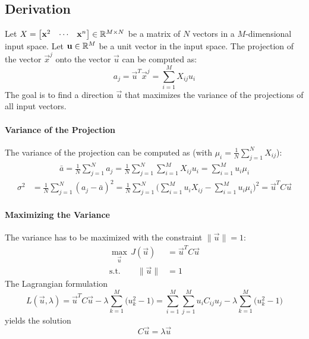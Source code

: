 		\subsection{Derivation}
			Let \( X = \begin{bmatrix} \boldsymbol{\mathrm{x}}^2 & \cdots & \boldsymbol{\mathrm{x}}^n \end{bmatrix} \in \mathbb{R}^{M \times N} \) be a matrix of \(N\) vectors in a \(M\)-dimensional input space. Let \( \boldsymbol{\mathrm{u}} \in \mathbb{R}^M \) be a unit vector in the input space. The projection of the vector \( \vec{x}^j \) onto the vector \(\vec{u}\) can be computed as:
			\begin{equation}
				a_j = \vec{u}^T \vec{x}^j = \sum_{i = 1}^{M} X_{ij} u_i
			\end{equation}
			The goal is to find a direction \(\vec{u}\) that maximizes the variance of the projections of all input vectors.

			\paragraph{Variance of the Projection} %
				The variance of the projection can be computed as (with \( \mu_i = \frac{1}{N} \sum_{j = 1}^{N} X_{ij} \)):
				\begin{align}
					\bar{a} = \frac{1}{N} \sum_{j = 1}^{N} a_j = \frac{1}{N} \sum_{j = 1}^{N} \sum_{i = 1}^{M} X_{ij} u_i = \sum_{i = 1}^{M} u_i \mu_i
				\end{align}
				\begin{align}
					\sigma^2 &= \frac{1}{N} \sum_{j = 1}^{N} (a_j - \bar{a})^2 = \frac{1}{N} \sum_{j = 1}^{N} \Bigg( \sum_{i = 1}^{M} u_i X_{ij} - \sum_{i = 1}^{M} u_i \mu_i \Bigg)^2 = \vec{u}^T C \vec{u}
				\end{align}

			\paragraph{Maximizing the Variance}
				The variance has to be maximized with the constraint \( \lVert \vec{u} \rVert = 1 \):
				\begin{align}
					\max_{\vec{u}} \, J(\vec{u}) &= \vec{u}^T C \vec{u} \\
					\textrm{s.t.} \qquad
					\lVert \vec{u} \rVert & = 1
				\end{align}
				The Lagrangian formulation
				\begin{equation}
					L(\vec{u}, \lambda) = \vec{u}^T C \vec{u} - \lambda \sum_{k = 1}^{M} \big(u_k^2 - 1\big) = \sum_{i = 1}^{M} \sum_{j = 1}^{M} u_i C_{ij} u_j - \lambda \sum_{k = 1}^{M} \big(u_k^2 - 1\big)
				\end{equation}
				yields the solution
				\begin{equation}
					C\vec{u} = \lambda\vec{u}
				\end{equation}
				
